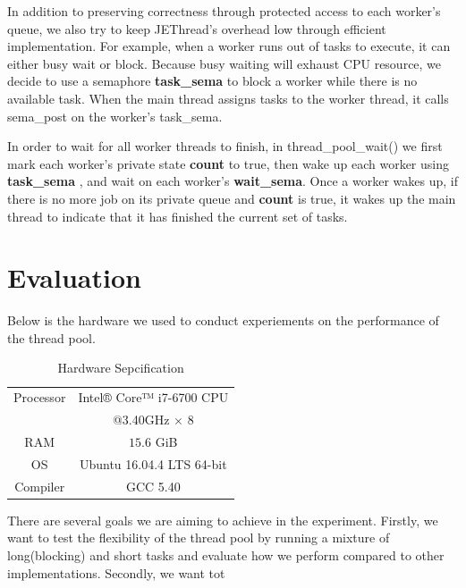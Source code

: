 \documentclass[journal, a4paper]{IEEEtran}
\begin{document}
In addition to preserving correctness through protected access to each worker's queue, we also try to keep JEThread's overhead low through efficient implementation. For example, when a worker runs out of tasks to execute, it can either busy wait or block. Because busy waiting will exhaust CPU resource, we decide to use a semaphore \textbf{task\_sema} to block a worker while there is no available task. When the main thread assigns tasks to the worker thread, it calls sema\_post on the worker's task\_sema. 

In order to wait for all worker threads to finish, in thread\_pool\_wait() we first mark each worker's private state \textbf{count} to true, then wake up each worker using \textbf{task\_sema} , and wait on each worker's \textbf{wait\_sema}. Once a worker wakes up, if there is no more job on its private queue and \textbf{count} is true, it wakes up the main thread to indicate that it has finished the current set of tasks. 

\section{Evaluation}
Below is the hardware we used to conduct experiements on the performance of the thread pool.
	\begin{table}[!hbt]
	\begin{center}
		\caption{Hardware Sepcification}
		\label{tab:simParameters}
		\begin{tabular}{|c|c|}
			\hline
			Processor & Intel® Core™ i7-6700 CPU \\
								&@3.40GHz $\times$ 8\\
			\hline
			RAM & $15.6$ GiB \\
			\hline
			OS & Ubuntu 16.04.4 LTS 64-bit\\
			\hline
			Compiler & GCC 5.40\\
			\hline
		\end{tabular}
		\end{center}
	\end{table}
	
There are several goals we are aiming to achieve in the experiment. Firstly, we want to test the flexibility of the thread pool by running a mixture of long(blocking) and short tasks and evaluate how we perform compared to other implementations. Secondly, we want tot
\end{document}
